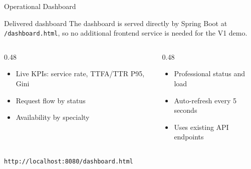 \documentclass[aspectratio=169,11pt]{beamer}
\begin{document}
\begin{frame}{Operational Dashboard}
  \begin{block}{Delivered dashboard}
    The dashboard is served directly by Spring Boot at \texttt{/dashboard.html}, so no additional frontend service is needed for the V1 demo.
  \end{block}

  \begin{columns}[T]
    \begin{column}{0.48\textwidth}
      \begin{itemize}
        \item Live KPIs: service rate, TTFA/TTR P95, Gini
        \item Request flow by status
        \item Availability by specialty
      \end{itemize}
    \end{column}
    \begin{column}{0.48\textwidth}
      \begin{itemize}
        \item Professional status and load
        \item Auto-refresh every 5 seconds
        \item Uses existing API endpoints
      \end{itemize}
    \end{column}
  \end{columns}

  \vspace{0.3cm}
  \begin{center}
    \texttt{http://localhost:8080/dashboard.html}
  \end{center}
\end{frame}
\end{document}
